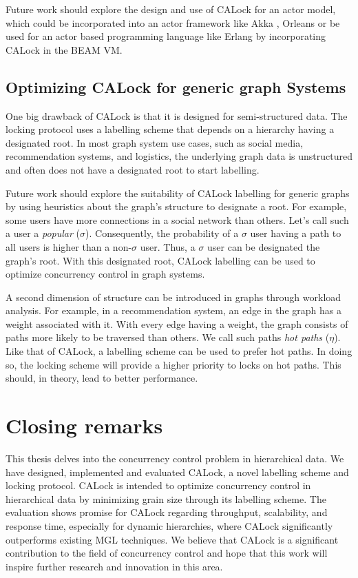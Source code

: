 Future work should explore the design and use of CALock for an actor model, which could be incorporated into an actor framework like Akka \cite{10.5555/2663429}, Orleans \cite{10.1145/2038916.2038932} or be used for an actor based programming language like Erlang \cite{armstrong1991erlang} by incorporating CALock in the BEAM VM.

\subsection{Optimizing CALock for generic graph Systems}

One big drawback of CALock is that it is designed for semi-structured data. The locking protocol uses a labelling scheme that depends on a hierarchy having a designated root. In most graph system use cases, such as social media, recommendation systems, and logistics, the underlying graph data is unstructured and often does not have a designated root to start labelling. 

Future work should explore the suitability of CALock labelling for generic graphs by using heuristics about the graph's structure to designate a root. For example, some users have more connections in a social network than others. Let's call such a user a \emph{popular} ($\sigma$). Consequently, the probability of a $\sigma$ user having a path to all users is higher than a non-$\sigma$ user. Thus, a $\sigma$ user can be designated the graph's root. With this designated root, CALock labelling can be used to optimize concurrency control in graph systems.

A second dimension of structure can be introduced in graphs through workload analysis. For example, in a recommendation system, an edge in the graph has a weight associated with it. With every edge having a weight, the graph consists of paths more likely to be traversed than others. We call such paths \emph{hot paths} ($\eta$). Like that of CALock, a labelling scheme can be used to prefer hot paths. In doing so, the locking scheme will provide a higher priority to locks on hot paths. This should, in theory, lead to better performance. 



\section{Closing remarks}

This thesis delves into the concurrency control problem in hierarchical data. We have designed, implemented and evaluated CALock, a novel labelling scheme and locking protocol. CALock is intended to optimize concurrency control in hierarchical data by minimizing grain size through its labelling scheme. The evaluation shows promise for CALock regarding throughput, scalability, and response time, especially for dynamic hierarchies, where CALock significantly outperforms existing MGL techniques. We believe that CALock is a significant contribution to the field of concurrency control and hope that this work will inspire further research and innovation in this area.